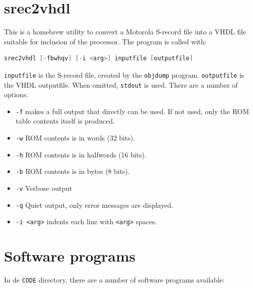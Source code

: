 \documentclass[12pt]{article}
\begin{document}
\section{srec2vhdl}
This is a homebrew utility to convert a Motorola S-record file into a VHDL file suitable for inclusion of the processor. The program is called with:

\begin{lstlisting}[language=c]
srec2vhdl [-fbwhqv] [-i <arg>] inputfile [outputfile]
\end{lstlisting}

\texttt{inputfile} is the S-record file, created by the \texttt{objdump} program. \texttt{outputfile} is the VHDL outputfile. When omitted, \texttt{stdout} is used. There are a number of options:

\begin{itemize}
\item \texttt{-f} makes a full output that directly can be used. If not used, only the ROM table contents itself is produced.
\item \texttt{-w} ROM contents is in words (32 bits).
\item \texttt{-h} ROM contents is in halfwords (16 bits).
\item \texttt{-b} ROM contents is in bytes (8 bits).
\item \texttt{-v} Verbose output
\item \texttt{-q} Quiet output, only error messages are displayed.
\item \texttt{-i <arg>} indents each line with \texttt{<arg>} spaces.
\end{itemize}

\section{Software programs}
In de \texttt{CODE} directory, there are a number of software programs available:
\end{document}

